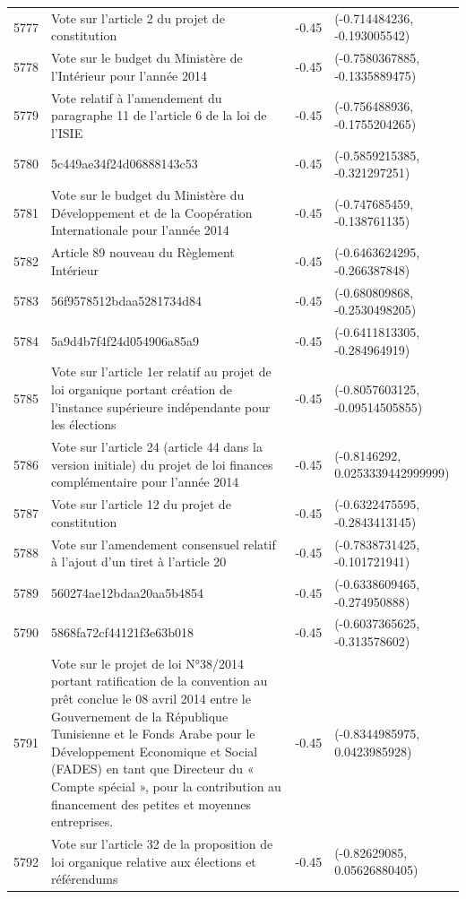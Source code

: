 \begin{table}[ht]
\begin{tabular}{rlrl}
  5777 & Vote sur l'article 2 du projet de constitution & -0.45 & (-0.714484236, -0.193005542) \\ 
  5778 & Vote sur le budget du Ministère de l'Intérieur pour l'année 2014 & -0.45 & (-0.7580367885, -0.1335889475) \\ 
  5779 & Vote relatif à l'amendement du paragraphe 11 de l'article 6 de la loi de l'ISIE & -0.45 & (-0.756488936, -0.1755204265) \\ 
  5780 & 5c449ae34f24d06888143c53 & -0.45 & (-0.5859215385, -0.321297251) \\ 
  5781 & Vote sur le budget du Ministère du Développement et de la Coopération Internationale pour l'année 2014 & -0.45 & (-0.747685459, -0.138761135) \\ 
  5782 & Article 89 nouveau du Règlement Intérieur & -0.45 & (-0.6463624295, -0.266387848) \\ 
  5783 & 56f9578512bdaa5281734d84 & -0.45 & (-0.680809868, -0.2530498205) \\ 
  5784 & 5a9d4b7f4f24d054906a85a9 & -0.45 & (-0.6411813305, -0.284964919) \\ 
  5785 & Vote sur l'article 1er relatif au projet de loi organique portant création de l'instance supérieure indépendante pour les élections & -0.45 & (-0.8057603125, -0.09514505855) \\ 
  5786 & Vote sur l'article 24 (article 44 dans la version initiale) du projet de loi finances complémentaire pour l'année 2014 & -0.45 & (-0.8146292, 0.0253339442999999) \\ 
  5787 & Vote sur l'article 12 du projet de constitution & -0.45 & (-0.6322475595, -0.2843413145) \\ 
  5788 & Vote sur l'amendement consensuel relatif à l'ajout d'un tiret à l'article 20 & -0.45 & (-0.7838731425, -0.101721941) \\ 
  5789 & 560274ae12bdaa20aa5b4854 & -0.45 & (-0.6338609465, -0.274950888) \\ 
  5790 & 5868fa72cf44121f3e63b018 & -0.45 & (-0.6037365625, -0.313578602) \\ 
  5791 & Vote sur le projet de loi N°38/2014 portant ratification de la convention au prêt conclue le 08 avril 2014 entre le Gouvernement de la République Tunisienne et le Fonds Arabe pour le Développement Economique et Social (FADES) en tant que Directeur du « Compte spécial », pour la contribution au financement des petites et moyennes entreprises. & -0.45 & (-0.8344985975, 0.0423985928) \\ 
  5792 & Vote sur l'article 32 de la proposition de loi organique relative aux élections et référendums & -0.45 & (-0.82629085, 0.05626880405) \\ 

\end{tabular}
\end{table}
